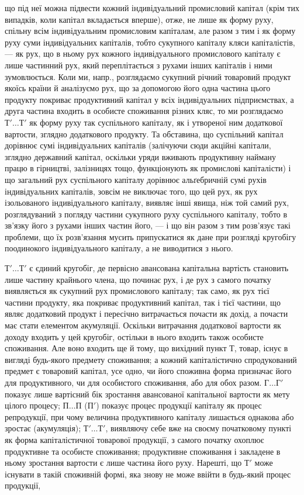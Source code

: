 \parcont{}  %
що під неї можна підвести кожний індивідуальний промисловий капітал (крім тих випадків, коли капітал
вкладається вперше), отже, не лише як форму руху, спільну всім індивідуальним промисловим капіталам,
але разом з тим і як форму руху суми індивідуальних капіталів, тобто сукупного капіталу кляси
капіталістів, — як рух, що в ньому рух кожного індивідуального промислового капіталу є лише
частинний рух, який переплітається з рухами інших капіталів і ними зумовлюється. Коли ми, напр.,
розглядаємо сукупний річний товаровий продукт якоїсь країни й аналізуємо рух, що за допомогою його
одна частина цього продукту покриває продуктивний капітал у всіх індивідуальних підприємствах, а
друга частина входить в особисте споживання різних кляс, то ми розглядаємо $Т'\dots{} Т'$ як форму руху
так суспільного капіталу, як і утвореної ним додаткової вартости, зглядно додаткового продукту. Та
обставина, що суспільний капітал дорівнює сумі індивідуальних капіталів (залічуючи сюди акційні
капітали, зглядно державний капітал, оскільки уряди вживають продуктивну найману працю в гірництві,
залізницях тощо, функціонують як промислові капіталісти) і що загальний рух суспільного капіталу
дорівнює альґебричній сумі рухів
індивідуальних капіталів, зовсім не виключає того, що цей рух, як рух ізольованого індивідуального
капіталу, виявляє інші явища, ніж той самий рух, розглядуваний з погляду частини сукупного руху
суспільного капіталу, тобто в зв’язку його з рухами інших частин його, — і що він разом з тим
розв’язує такі проблеми, що їх розв’язання мусить припускатися як дане при розгляді кругобігу
поодинокого індивідуального капіталу, а не виводитися з нього.

$Т'\dots{} Т'$ є єдиний кругобіг, де первісно авансована капітальна вартість становить лише частину
крайнього члена, що починає рух, і де рух з самого початку виявляється як сукупний рух промислового
капіталу; так само, як рух тієї частини продукту, яка покриває продуктивний капітал, так і тієї
частини, що являє додатковий продукт і пересічно витрачається почасти як дохід, а почасти має стати
елементом акумуляції. Оскільки витрачання додаткової вартости як доходу входить у цей кругобіг,
остільки в нього входить також особисте споживання. Але воно входить ще й тому, що вихідний пункт $Т$,
товар, існує в вигляді будь-якого предмету споживання; а кожний капіталістично спродукований предмет
є товаровий капітал, усе одно, чи його споживна форма призначає його для продуктивного, чи для
особистого споживання, або для обох разом. $Г\dots{} Г'$ показує лише вартісний бік зростання авансованої
капітальної вартости як мету цілого процесу; $П\dots{} П$ ($П'$) показує процес продукції капіталу як процес
репродукції, при чому величина продуктивного капіталу лишається однакова або зростає (акумуляція);
$Т'\dots{} Т'$, виявляючу себе вже на своєму початковому пункті як форма капіталістичної товарової
продукції, з самого початку охоплює продуктивне та особисте споживання; продуктивне споживання і
закладене в ньому зростання вартости є лише частина його руху. Нарешті, що $Т'$ може існувати в такій
споживній формі, яка знову не може ввійти в будь-який процес продукції,
\parbreak{}  %
